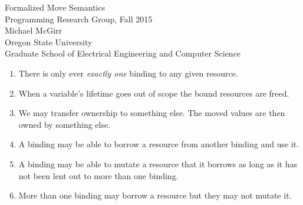 \documentclass[10pt]{article}
\begin{document}
\vspace{2.0cm}

\begin{center}
    {\huge Formalized Move Semantics} 
    \vspace{0.1in} \\
    {\large Programming Research Group, Fall 2015} 
    \vspace{0.1in} \\
    {\large Michael McGirr} 
    \vspace{0.1in} \\
    {\large Oregon State University} 
    \vspace{0.1in} \\
    {\large Graduate School of Electrical Engineering and Computer Science}  
\end{center}

\vspace{1.0cm}

\begin{enumerate}
    \item There is only ever \textit{exactly one} binding to any given resource.

    \item When a variable's lifetime goes out of scope the bound resources are freed.

    \item We may transfer ownership to something else. The moved values are then
          owned by something else.

    \item A binding may be able to borrow a resource from another binding and
          use it.

    \item A binding may be able to mutate a resource that it borrows as long as
          it has not been lent out to more than one binding.

    \item More than one binding may borrow a resource but they may not mutate it.


\end{enumerate}
\end{document}
